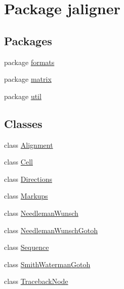 \hypertarget{namespacejaligner}{\section{Package jaligner}
\label{namespacejaligner}
}
\subsection*{Packages}
\begin{DoxyCompactItemize}
\item 
package \hyperlink{namespacejaligner_1_1formats}{formats}
\item 
package \hyperlink{namespacejaligner_1_1matrix}{matrix}
\item 
package \hyperlink{namespacejaligner_1_1util}{util}
\end{DoxyCompactItemize}
\subsection*{Classes}
\begin{DoxyCompactItemize}
\item 
class \hyperlink{classjaligner_1_1_alignment}{Alignment}
\item 
class \hyperlink{classjaligner_1_1_cell}{Cell}
\item 
class \hyperlink{classjaligner_1_1_directions}{Directions}
\item 
class \hyperlink{classjaligner_1_1_markups}{Markups}
\item 
class \hyperlink{classjaligner_1_1_needleman_wunsch}{Needleman\+Wunsch}
\item 
class \hyperlink{classjaligner_1_1_needleman_wunsch_gotoh}{Needleman\+Wunsch\+Gotoh}
\item 
class \hyperlink{classjaligner_1_1_sequence}{Sequence}
\item 
class \hyperlink{classjaligner_1_1_smith_waterman_gotoh}{Smith\+Waterman\+Gotoh}
\item 
class \hyperlink{classjaligner_1_1_traceback_node}{Traceback\+Node}
\end{DoxyCompactItemize}
